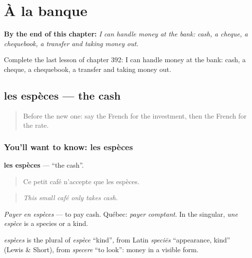 
\chapter{À la banque}
\label{ch:fr-a-la-banque}

\begin{chapteropening}
\textbf{By the end of this chapter:} \emph{I can handle money at the bank: cash, a cheque, a chequebook, a transfer and taking money out.}

Complete the last lesson of chapter 392: I can handle money at the bank: cash, a cheque, a chequebook, a transfer and taking money out.
\end{chapteropening}

\section[les espèces]{les espèces — the cash}

\label{lesson:FR-C392-especes}



\begin{quote}
Before the new one: say the French for the investment, then the French for the rate.
\end{quote}

\subsection*{You'll want to know: les espèces}
\textbf{les espèces} — \textquotedblleft{}the cash\textquotedblright{}.

\begin{quote}
Ce petit café n'accepte que les espèces.
\end{quote}

\begin{quote}
\emph{This small café only takes cash.}
\end{quote}

\emph{Payer en espèces} — to pay cash. Québec: \emph{payer comptant}. In the singular, \emph{une espèce} is a species or a kind.

\begin{cousinweb}
\emph{espèces} is the plural of \emph{espèce} \textquotedblleft{}kind\textquotedblright{}, from Latin \emph{speciēs} \textquotedblleft{}appearance, kind\textquotedblright{} (Lewis \& Short), from \emph{specere} \textquotedblleft{}to look\textquotedblright{}: money in a visible form.
\end{cousinweb}

